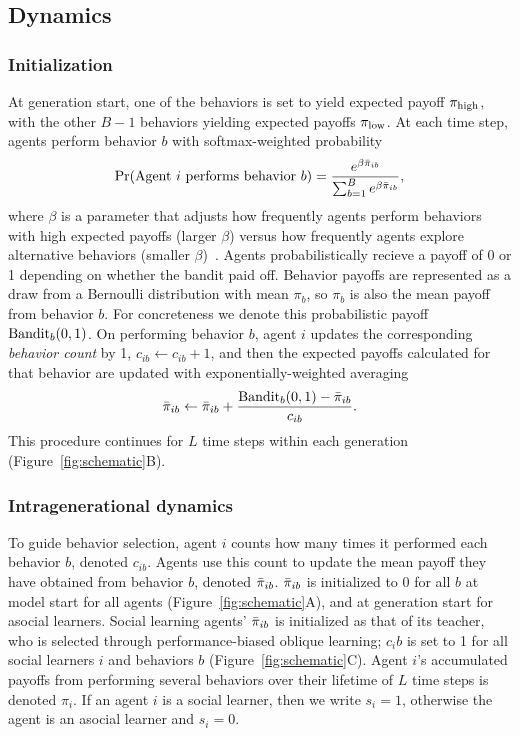 \documentclass[letterpaper,11.5pt]{scrartcl}
\begin{document}
\subsection{Dynamics}

\subsubsection{Initialization}

At generation start, one of the behaviors is set to 
yield expected payoff $\pi_{\mathrm{high}}$, with the other $B-1$ behaviors yielding
expected payoffs $\pi_{\mathrm{low}}$. At each time step, agents perform behavior $b$ 
with softmax-weighted probability
\begin{equation}
  \Pr(\text{Agent $i$ performs behavior $b$}) = 
    \frac{e^{\beta \bar\pi_{ib}}}{\sum_{b=1}^B e^{\beta \bar\pi_{ib}}},
\end{equation}
\noindent
where $\beta$ is a parameter that adjusts how frequently agents perform 
behaviors with high expected payoffs (larger $\beta$) versus how frequently
agents explore alternative behaviors (smaller $\beta$)~\cite{McElreath2005}. 
Agents probabilistically recieve a payoff of 0 or 1 depending on whether the
bandit paid off. Behavior payoffs are represented as a draw from a 
Bernoulli distribution with mean $\pi_b$, so $\pi_b$ is also the mean payoff from
behavior $b$.  For concreteness we denote this probabilistic payoff
$\text{Bandit}_b(0, 1)$. On performing behavior $b$, agent $i$ updates the
corresponding \emph{behavior count} by 1, $c_{ib} \leftarrow c_{ib} + 1$, and then
the expected payoffs calculated for that behavior are updated with
exponentially-weighted averaging
\begin{equation}
  \bar\pi_{ib} \leftarrow \bar\pi_{ib} + \frac{\text{Bandit}_b(0, 1) - \bar\pi_{ib}}{c_{ib}}.
\end{equation}
\noindent
This procedure continues for $L$ time steps within each generation
(Figure~\ref{fig:schematic}B).


\subsubsection{Intragenerational dynamics}

To guide behavior selection, agent $i$ counts how many times it
performed each behavior $b$, denoted $c_{ib}$. Agents use this count to 
update the mean payoff they have obtained from behavior $b$, denoted $\bar\pi_{ib}$.
$\bar\pi_{ib}$ is initialized to 0 for all $b$ at model start for
all agents (Figure~\ref{fig:schematic}A), and at 
generation start for asocial learners. Social
learning agents' $\bar\pi_{ib}$ is initialized as that of its teacher, who is selected
through performance-biased oblique learning; $c_ib$ is set to 1 for all social
learners $i$ and behaviors $b$ (Figure~\ref{fig:schematic}C). Agent $i$'s
accumulated payoffs from performing several behaviors over their lifetime of $L$
time steps is denoted $\pi_{i}$. If an agent $i$ is a social learner, then we write
$s_i = 1$, otherwise the agent is an asocial learner and $s_i = 0$.
\end{document}

